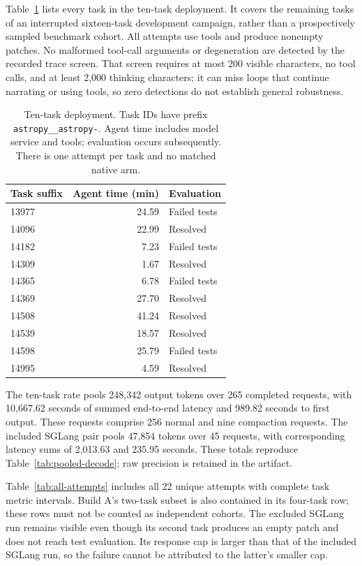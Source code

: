Table~\ref{tab:swe-tasks} lists every task in the ten-task deployment. It covers the remaining tasks of an interrupted sixteen-task development campaign, rather than a prospectively sampled benchmark cohort. All attempts use tools and produce nonempty patches. No malformed tool-call arguments or degeneration are detected by the recorded trace screen. That screen requires at most 200 visible characters, no tool calls, and at least 2,000 thinking characters; it can miss loops that continue narrating or using tools, so zero detections do not establish general robustness.

\begin{table}[t]
\caption{Ten-task \sys{} deployment. Task IDs have prefix \texttt{astropy\_\_astropy-}. Agent time includes model service and tools; evaluation occurs subsequently. There is one attempt per task and no matched native arm.}
\label{tab:swe-tasks}
\centering\small
\begin{tabular}{@{}lrl@{}}
\toprule
Task suffix & Agent time (min) & Evaluation \\
\midrule
13977 & 24.59 & Failed tests \\
14096 & 22.99 & Resolved \\
14182 & 7.23 & Failed tests \\
14309 & 1.67 & Resolved \\
14365 & 6.78 & Failed tests \\
14369 & 27.70 & Resolved \\
14508 & 41.24 & Resolved \\
14539 & 18.57 & Resolved \\
14598 & 25.79 & Failed tests \\
14995 & 4.59 & Resolved \\
\bottomrule
\end{tabular}
\end{table}

The ten-task rate pools 248,342 output tokens over 265 completed requests, with 10,667.62 seconds of summed end-to-end latency and 989.82 seconds to first output. These requests comprise 256 normal and nine compaction requests. The included SGLang pair pools 47,854 tokens over 45 requests, with corresponding latency sums of 2,013.63 and 235.95 seconds. These totals reproduce Table~\ref{tab:pooled-decode}; raw precision is retained in the artifact.

Table~\ref{tab:all-attempts} includes all 22 unique attempts with complete task metric intervals. Build A's two-task subset is also contained in its four-task row; these rows must not be counted as independent cohorts. The excluded SGLang run remains visible even though its second task produces an empty patch and does not reach test evaluation. Its response cap is larger than that of the included SGLang run, so the failure cannot be attributed to the latter's smaller cap.

